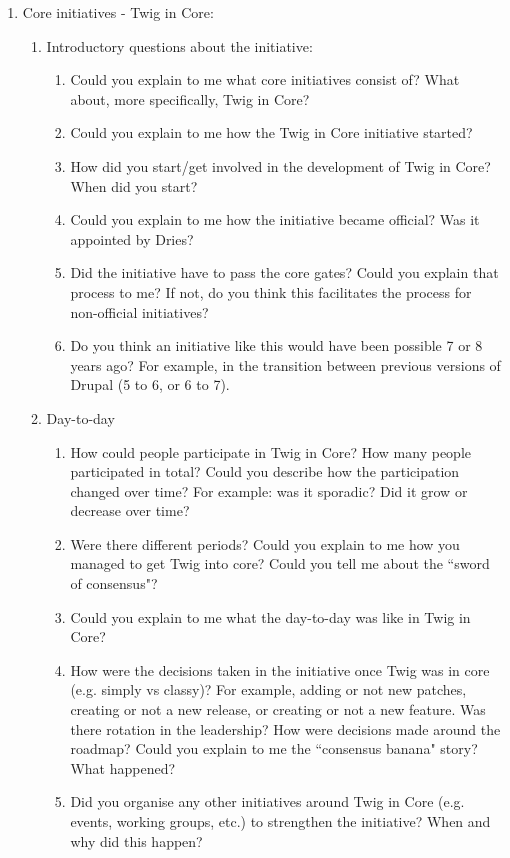 \begin{enumerate}
	\item Core initiatives - Twig in Core:
		\begin{enumerate}
			\item Introductory questions about the initiative:
				\begin{enumerate}
					\item Could you explain to me what core initiatives consist of? What about, more specifically, Twig in Core?
					\item Could you explain to me how the Twig in Core initiative started?
					\item How did you start/get involved in the development of Twig in Core? When did you start?
					\item Could you explain to me how the initiative became official? Was it appointed by Dries?
					\item Did the initiative have to pass the core gates? Could you explain that process to me? If not, do you think this facilitates the process for non-official initiatives?
					\item Do you think an initiative like this would have been possible 7 or 8 years ago? For example, in the transition between previous versions of Drupal (5 to 6, or 6 to 7).
				\end{enumerate}		
			\item Day-to-day
				\begin{enumerate}
					\item How could people participate in Twig in Core? How many people participated in total? Could you describe how the participation changed over time? For example: was it sporadic? Did it grow or decrease over time?
					\item Were there different periods? Could you explain to me how you managed to get Twig into core? Could you tell me about the ``sword of consensus"?
					\item Could you explain to me what the day-to-day was like in Twig in Core?
					\item How were the decisions taken in the initiative once Twig was in core (e.g. simply vs classy)? For example, adding or not new patches, creating or not a new release, or creating or not a new feature. Was there rotation in the leadership? How were decisions made around the roadmap? Could you explain to me the ``consensus banana" story? What happened?
					\item Did you organise any other initiatives around Twig in Core (e.g. events, working groups, etc.) to strengthen the initiative? When and why did this happen?

\end{enumerate}
\end{enumerate}
\end{enumerate}
